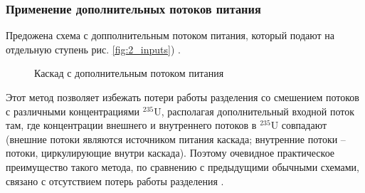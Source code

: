 \subsubsection{Применение дополнительных потоков питания}
Предожена схема с допполнительным потоком питания, который подают на отдельную ступень рис. \ref{fig:2_inputs}) \cite{sulaberidzeQuasiidealCascadesAdditional2006}.
\begin{figure}[ht]
  \caption{Каскад с дополнительным потоком питания}
\end{figure}

Этот метод позволяет избежать потери работы разделения со смешением потоков с различными концентрациями $^{235}$U, располагая дополнительный входной поток там, где концентрации внешнего и внутреннего потоков в $^{235}$U совпадают (внешние потоки являются источником питания каскада; внутренние потоки -- потоки, циркулирующие внутри каскада). Поэтому очевидное практическое преимущество такого метода, по сравнению с предыдущими обычными схемами, связано с отсутствием потерь работы разделения \cite{smirnovKaskadnyeShemyZadachah2012, sulaberidzeQuasiidealCascadesAdditional2006}.


